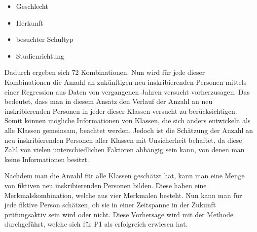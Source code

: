 \begin{itemize}
  \item Geschlecht
  \item Herkunft
  \item besuchter Schultyp
  \item Studienrichtung
\end{itemize}

Dadurch ergeben sich 72 Kombinationen. Nun wird f\"ur jede dieser Kombinationen die Anzahl an zuk\"unftigen neu inskribierenden Personen mittels einer Regression aus Daten von
vergangenen Jahren versucht vorherzusagen. Das bedeutet, dass man in diesem Ansatz den Verlauf der Anzahl an neu inskribierenden Personen in jeder dieser Klassen versucht zu
ber\"ucksichtigen. Somit k\"onnen m\"ogliche Informationen von Klassen, die sich anders entwickeln als alle Klassen gemeinsam, beachtet werden. Jedoch ist die Sch\"atzung der
Anzahl an neu inskribierenden Personen aller Klassen mit Unsicherheit behaftet, da diese Zahl von vielen unterschiedlichen Faktoren abh\"angig sein kann, 
von denen man keine Informationen besitzt.

Nachdem man die Anzahl f\"ur alle Klassen gesch\"atzt hat, kann man eine Menge von fiktiven neu inskribierenden Personen bilden. Diese haben eine Merkmalskombination,
welche aus vier Merkmalen besteht. Nun kann man f\"ur jede fiktive Person sch\"atzen, ob sie in einer Zeitspanne in der Zukunft pr\"ufungsaktiv sein wird oder nicht.
Diese Vorhersage wird mit der Methode durchgef\"uhrt, welche sich f\"ur P1 als erfolgreich erwiesen hat.